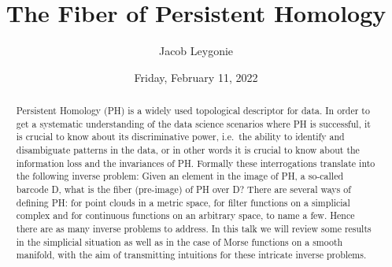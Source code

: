 \documentclass{UAmathtalk}
\author{Jacob Leygonie}
\title{The Fiber of Persistent Homology}
\date{Friday, February 11, 2022}
\begin{document}
\maketitle

\begin{abstract}
Persistent Homology (PH) is a widely used topological descriptor for data. In order to get a systematic understanding of the data science scenarios where PH is successful, it is crucial to know about its discriminative power, i.e.~the ability to identify and disambiguate patterns in the data, or in other words it is crucial to know about the information loss and the invariances of PH. Formally these interrogations translate into the following inverse problem: Given an element in the image of PH, a so-called barcode D, what is the fiber (pre-image) of PH over D? 
There are several ways of defining PH: for point clouds in a metric space, for filter functions on a simplicial complex and for continuous functions on an arbitrary space, to name a few. Hence there are as many inverse problems to address. In this talk we will review some results in the simplicial situation as well as in the case of Morse functions on a smooth manifold, with the aim of transmitting intuitions for these intricate inverse problems.
\end{abstract}
\end{document}
